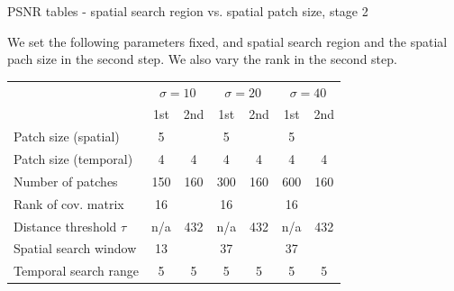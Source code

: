 \documentclass[mathserif, 8pt]{beamer}
\begin{document}
\begin{frame}{PSNR tables - spatial search region vs. spatial patch size, stage 2}

	We set the following parameters fixed, and spatial search region and the
	spatial pach size in the second step. We also vary the rank in the second
	step.

	\begin{center}
	\begin{tabular}{l | c c | c c | c c }
		& \multicolumn{2}{c|}{$\sigma = 10$} 
		& \multicolumn{2}{c|}{$\sigma = 20$} 
		& \multicolumn{2}{c}{$\sigma = 40$} \\
		                            & 1st  & 2nd  & 1st  & 2nd  & 1st  & 2nd \\\hline\hline
		Patch size (spatial)        &  5   &      &  5   &      &  5   &     \\
		Patch size (temporal)       &  4   &   4  &  4   &   4  &  4   &   4 \\
		Number of patches           & 150  & 160  & 300  & 160  & 600  & 160 \\
		Rank of cov. matrix         & 16   &      & 16   &      & 16   &     \\
		Distance threshold $\tau$   & n/a  & 432  & n/a  & 432  & n/a  & 432 \\
		Spatial search window       & 13   &      & 37   &      & 37   &     \\
		Temporal search range       & 5    & 5    & 5    & 5    & 5    & 5   \\\hline
	\end{tabular}
	\end{center}

\end{frame}
\end{document}
